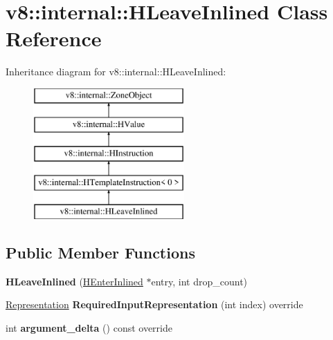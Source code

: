 \hypertarget{classv8_1_1internal_1_1_h_leave_inlined}{}\section{v8\+:\+:internal\+:\+:H\+Leave\+Inlined Class Reference}
\label{classv8_1_1internal_1_1_h_leave_inlined}
Inheritance diagram for v8\+:\+:internal\+:\+:H\+Leave\+Inlined\+:\begin{figure}[H]
\begin{center}
\leavevmode
\includegraphics[height=5.000000cm]{classv8_1_1internal_1_1_h_leave_inlined}
\end{center}
\end{figure}
\subsection*{Public Member Functions}
\begin{DoxyCompactItemize}
\item 
{\bfseries H\+Leave\+Inlined} (\hyperlink{classv8_1_1internal_1_1_h_enter_inlined}{H\+Enter\+Inlined} $\ast$entry, int drop\+\_\+count)\hypertarget{classv8_1_1internal_1_1_h_leave_inlined_a6846e3de8c00d999d0edc4e59d9863a0}{}\label{classv8_1_1internal_1_1_h_leave_inlined_a6846e3de8c00d999d0edc4e59d9863a0}

\item 
\hyperlink{classv8_1_1internal_1_1_representation}{Representation} {\bfseries Required\+Input\+Representation} (int index) override\hypertarget{classv8_1_1internal_1_1_h_leave_inlined_ad1bd530b0db6559881dcb7ab63a9f4c8}{}\label{classv8_1_1internal_1_1_h_leave_inlined_ad1bd530b0db6559881dcb7ab63a9f4c8}

\item 
int {\bfseries argument\+\_\+delta} () const  override\hypertarget{classv8_1_1internal_1_1_h_leave_inlined_a9be23271da1918dc0631ce1e485c7097}{}\label{classv8_1_1internal_1_1_h_leave_inlined_a9be23271da1918dc0631ce1e485c7097}

\end{DoxyCompactItemize}
